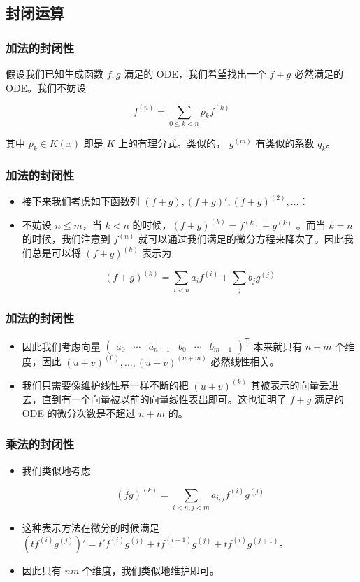 \documentclass[mathserif]{ctexbeamer}
\begin{document}
\subsection{封闭运算}

\frame
{
  \frametitle{加法的封闭性}
  
  假设我们已知生成函数 $f,g$ 满足的 ODE，我们希望找出一个 $f+g$ 必然满足的 ODE。我们不妨设

  $$
  f^{(n)} = \sum_{0\le k<n} p_k f^{(k)}
  $$

  其中 $p_k \in K(x)$ 即是 $K$ 上的有理分式。类似的， $g^{(m)}$ 有类似的系数 $q_k$。
}

\frame
{
  \frametitle{加法的封闭性}
  
  \begin{itemize}
  \item<1-> 接下来我们考虑如下函数列 $(f + g), (f+g)', (f+g)^{(2)},\dots$：

  \item<2-> 不妨设 $n\le m$，当 $k<n$ 的时候，$(f+g)^{(k)} = f^{(k)} + g^{(k)}$ 。而当 $k=n$ 的时候，我们注意到 $f^{(n)}$ 就可以通过我们满足的微分方程来降次了。因此我们总是可以将 $(f+g)^{(k)}$ 表示为 

  $$
  (f+g)^{(k)} = \sum_{i<n} a_i f^{(i)} + \sum_j b_jg^{(j)}
  $$
  \end{itemize}
}

\frame
{
  \frametitle{加法的封闭性}
  
  \begin{itemize}
  \item<1-> 因此我们考虑向量 $\begin{pmatrix}a_0 & \cdots & a_{n-1} & b_0 & \cdots & b_{m-1}\end{pmatrix}^{\mathsf T}$ 本来就只有 $n+m$ 个维度，因此 $(u+v)^{(0)}, \dots, (u+v)^{(n+m)}$ 必然线性相关。
  \item<2->我们只需要像维护线性基一样不断的把 $(u+v)^{(k)}$ 其被表示的向量丢进去，直到有一个向量被以前的向量线性表出即可。这也证明了 $f+g$ 满足的 ODE 的微分次数是不超过 $n+m$ 的。
  \end{itemize}
}

\frame
{
  \frametitle{乘法的封闭性}
  
  \begin{itemize}
  \item<1-> 我们类似地考虑

  $$
  (fg)^{(k)} = \sum_{i<n,j<m} a_{i,j} f^{(i)}g^{(j)}
  $$

  \item<2-> 这种表示方法在微分的时候满足 $(tf^{(i)}g^{(j)})'=t'f^{(i)}g^{(j)} + tf^{(i+1)}g^{(j)} + tf^{(i)}g^{(j+1)}$。

  \item<3-> 因此只有 $nm$ 个维度，我们类似地维护即可。
  \end{itemize}
}
\end{document}
